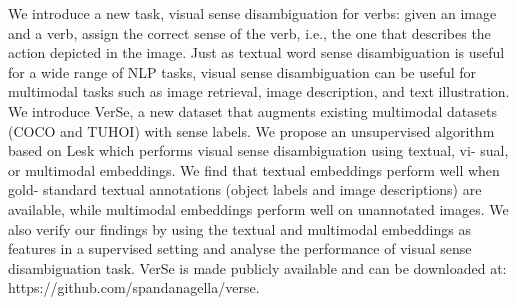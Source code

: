 We introduce a new task, visual sense disambiguation for verbs: given an image and a verb, assign the correct sense of the verb, i.e., the one that describes the action depicted in the image. Just as textual word sense disambiguation is useful for a wide range of NLP tasks, visual sense disambiguation can be useful for multimodal tasks such as image retrieval, image description, and text illustration. We introduce VerSe, a new dataset that augments existing multimodal datasets (COCO and TUHOI) with sense labels. We propose an unsupervised algorithm based on Lesk which performs visual sense disambiguation using textual, vi- sual, or multimodal embeddings. We find that textual embeddings perform well when gold- standard textual annotations (object labels and image descriptions) are available, while multimodal embeddings perform well on unannotated images. We also verify our findings by using the textual and multimodal embeddings as features in a supervised setting and analyse the performance of visual sense disambiguation task. VerSe is made publicly available and can be downloaded at: https://github.com/spandanagella/verse.
